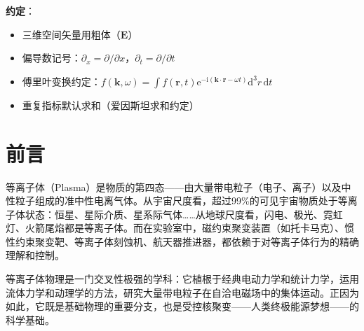 \documentclass[12pt,a4paper,openany,oneside]{book}
\newcommand{\diff}{\mathrm{d}}
\newcommand{\ii}{\mathrm{i}}
\newcommand{\ee}{\mathrm{e}}
\newcommand{\vect}[1]{\bm{#1}}
\begin{document}
\vspace{1em}
\noindent\textbf{约定}：
\begin{itemize}[nosep]
\item 三维空间矢量用粗体（$\vect{E}$）
\item 偏导数记号：$\partial_x = \partial/\partial x$，$\partial_t = \partial/\partial t$
\item 傅里叶变换约定：$f(\vect{k},\omega) = \int f(\vect{r},t) \ee^{-\ii(\vect{k}\cdot\vect{r}-\omega t)} \diff^3r\,\diff t$
\item 重复指标默认求和（爱因斯坦求和约定）
\end{itemize}
\newpage
\chapter*{前言}
等离子体（Plasma）是物质的第四态——由大量带电粒子（电子、离子）以及中性粒子组成的准中性电离气体。从宇宙尺度看，超过99\%的可见宇宙物质处于等离子体状态：恒星、星际介质、星系际气体……从地球尺度看，闪电、极光、霓虹灯、火箭尾焰都是等离子体。而在实验室中，磁约束聚变装置（如托卡马克）、惯性约束聚变靶、等离子体刻蚀机、航天器推进器，都依赖于对等离子体行为的精确理解和控制。

等离子体物理是一门交叉性极强的学科：它植根于经典电动力学和统计力学，运用流体力学和动理学的方法，研究大量带电粒子在自洽电磁场中的集体运动。正因为如此，它既是基础物理的重要分支，也是受控核聚变——人类终极能源梦想——的科学基础。
\end{document}
